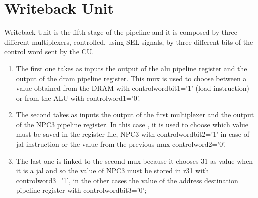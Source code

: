 \chapter{Writeback Unit}
\label{Writeback Unit}
Writeback Unit is the fifth stage of the pipeline and it is composed by three different multiplexers, controlled, using SEL signals, by three different bits of the control word sent by the CU.
\begin{enumerate} 
    \item The first one takes as inputs the output of the alu pipeline register and the output of the dram pipeline register. This mux is used to choose between a value obtained
    from the DRAM with controlwordbit1='1' (load instruction) or from the ALU with controlword1='0'.
    \item The second takes as inputs the output of the first multiplexer and the output of the NPC3 pipeline register. In this case , it is used to choose which value must be saved
    in the register file, NPC3 with controlwordbit2='1' in case of jal instruction or the value from the previous mux controlword2='0'.
    \item The last one is linked to the second mux because it chooses 31 as value when it is a jal and so the value of NPC3 must be stored in r31 with controlword3='1', in the other cases
    the value of the address destination pipeline register with controlwordbit3='0';
\end{enumerate}